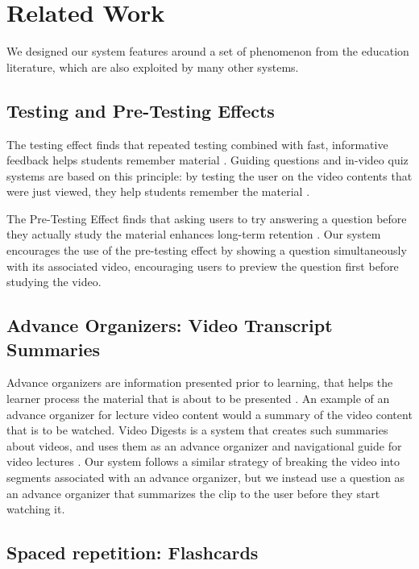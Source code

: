\documentclass{chi-ext}
\begin{document}
\section{Related Work}
We designed our system features around a set of phenomenon from the education literature, which are also exploited by many other systems.

\subsection{Testing and Pre-Testing Effects}

The testing effect finds that repeated testing combined with fast, informative feedback helps students remember material \cite{testingeffect}. Guiding questions and in-video quiz systems are based on this principle: by testing the user on the video contents that were just viewed, they help students remember the material \cite{guidingquestions}.

The Pre-Testing Effect finds that asking users to try answering a question before they actually study the material enhances long-term retention \cite{pretesting}. Our system encourages the use of the pre-testing effect by showing a question simultaneously with its associated video, encouraging users to preview the question first before studying the video.

\subsection{Advance Organizers: Video Transcript Summaries}

Advance organizers are information presented prior to learning, that helps the learner process the material that is about to be presented  \cite{advanceorganizers}. An example of an advance organizer for lecture video content would a summary of the video content that is to be watched. Video Digests is a system that creates such summaries about videos, and uses them as an advance organizer and navigational guide for video lectures \cite{videodigests}. Our system follows a similar strategy of breaking the video into segments associated with an advance organizer, but we instead use a question as an advance organizer that summarizes the clip to the user before they start watching it.

\subsection{Spaced repetition: Flashcards}
\end{document}
